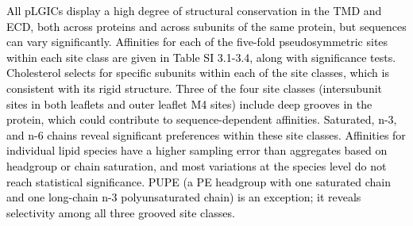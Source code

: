\documentclass[%
 aip,
 amsmath,amssymb,
 preprint,%
]{revtex4-1}\usepackage{setspace}
\newcommand{\grace}[1]{\textcolor{black}{{#1}}}
\newcommand{\plgic}{pLGIC}
\begin{document}
\grace{All pLGICs display a high degree of structural conservation in the TMD and ECD, both across proteins and across subunits of the same protein, but sequences can vary significantly. Affinities for each of the five-fold pseudosymmetric sites within each site class are given in Table SI 3.1-3.4, along with significance tests. Cholesterol selects for specific subunits within each of the site classes, which is consistent with its rigid structure. Three of the four site classes (intersubunit sites in both leaflets and outer leaflet M4 sites) include deep grooves in the protein, which could contribute to sequence-dependent affinities. Saturated, n-3, and n-6 chains reveal significant preferences within these site classes. Affinities for individual lipid species have a higher sampling error than aggregates based on headgroup or chain saturation, and most variations at the species level do not reach statistical significance. PUPE (a PE headgroup with one saturated chain and one long-chain n-3 polyunsaturated chain) is an exception; it reveals selectivity among all three grooved site classes.}

\end{document}
